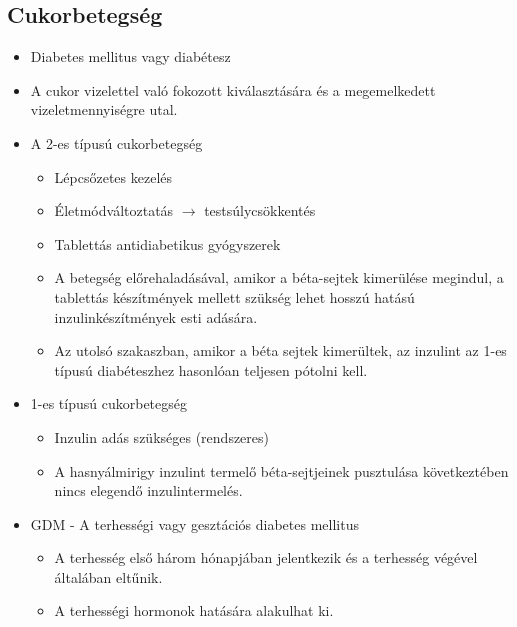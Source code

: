 \subsection{Cukorbetegség}
\begin{itemize}
    \item Diabetes mellitus vagy diabétesz
    \item A cukor vizelettel való fokozott kiválasztására és a megemelkedett vizeletmennyiségre utal.
    \item A 2-es típusú cukorbetegség
    \begin{itemize}
        \item Lépcsőzetes kezelés
        \item Életmódváltoztatás $\rightarrow$ testsúlycsökkentés
        \item Tablettás antidiabetikus gyógyszerek
        \item A betegség előrehaladásával, amikor a béta-sejtek kimerülése megindul, a tablettás készítmények mellett szükség lehet hosszú hatású inzulinkészítmények esti adására.
        \item Az utolsó szakaszban, amikor a béta sejtek kimerültek, az inzulint az 1-es típusú diabéteszhez hasonlóan teljesen pótolni kell.        
    \end{itemize}
    \item 1-es típusú cukorbetegség
    \begin{itemize}
        \item Inzulin adás szükséges (rendszeres)
        \item A hasnyálmirigy inzulint termelő béta-sejtjeinek pusztulása következtében nincs elegendő inzulintermelés.
    \end{itemize}
    \item GDM - A terhességi vagy gesztációs diabetes mellitus
    \begin{itemize}
        \item A terhesség első három hónapjában jelentkezik és a terhesség végével általában eltűnik.
        \item A terhességi hormonok hatására alakulhat ki.
    \end{itemize}
\end{itemize}

\clearpage
